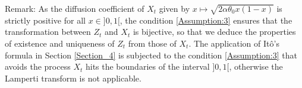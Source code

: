 \documentclass[11pt]{article}
\theoremstyle{definition}
\begin{document}
Remark: As the diffusion coefficient of $X_t$  given by  $x \mapsto \sqrt{2 \alpha \theta_0 x(1-x)}$  is strictly positive for all $x \in  ]0,1[$, the condition \eqref{Assumption:3}  ensures that the transformation between $Z_t$ and $X_t$ is bijective, so that we deduce the properties of existence and uniqueness of $Z_t$ from those of $X_t$. The application of  It\^{o}'s formula in Section \ref{Section_4} is subjected to the condition \eqref{Assumption:3} that avoids the process $X_t$ hits the boundaries of the interval $ ]0,1[$, otherwise the Lamperti transform is not applicable.



\nocite{*}
 
\printbibliography[keyword={Wind-SDE},title={References}]
\end{document}

